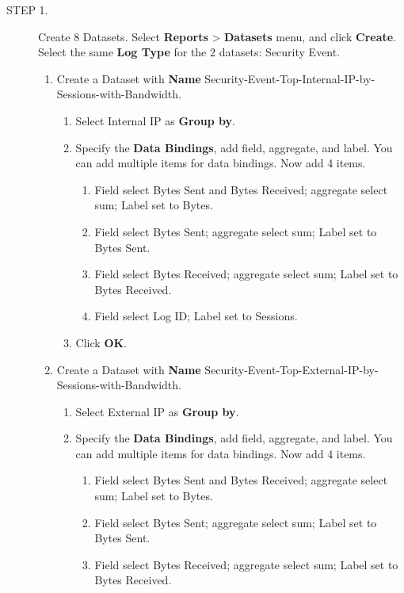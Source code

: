 \begin{description}
    \item[STEP 1.]	Create 8 Datasets. Select \textbf{Reports} > \textbf{Datasets} menu, and click \textbf{Create}. Select the same \textbf{Log Type} for the 2 datasets: Security Event.
    \begin{enumerate}
        \item Create a Dataset with \textbf{Name} Security-Event-Top-Internal-IP-by-Sessions-with-Bandwidth.
        \begin{enumerate}
            \item	Select Internal IP as \textbf{Group by}. 
            \item	Specify the \textbf{Data Bindings}, add field, aggregate, and label. You can add multiple items for data bindings. Now add 4 items. 
            \begin{enumerate}
                \item	Field select Bytes Sent and Bytes Received; aggregate select sum; Label set to Bytes. 
                \item	Field select Bytes Sent; aggregate select sum; Label set to Bytes Sent. 
                \item	Field select Bytes Received; aggregate select sum; Label set to Bytes Received. 
                \item	Field select Log ID; Label set to Sessions.
            \end{enumerate}
            \item	Click \textbf{OK}.
        \end{enumerate}
        \item Create a Dataset with \textbf{Name} Security-Event-Top-External-IP-by-Sessions-with-Bandwidth.
        \begin{enumerate}
            \item	Select External IP as \textbf{Group by}. 
            \item	Specify the \textbf{Data Bindings}, add field, aggregate, and label. You can add multiple items for data bindings. Now add 4 items. 
            \begin{enumerate}
                \item	Field select Bytes Sent and Bytes Received; aggregate select sum; Label set to Bytes. 
                \item	Field select Bytes Sent; aggregate select sum; Label set to Bytes Sent. 
                \item	Field select Bytes Received; aggregate select sum; Label set to Bytes Received. 

\end{enumerate}
\end{enumerate}
\end{enumerate}
\end{description}
